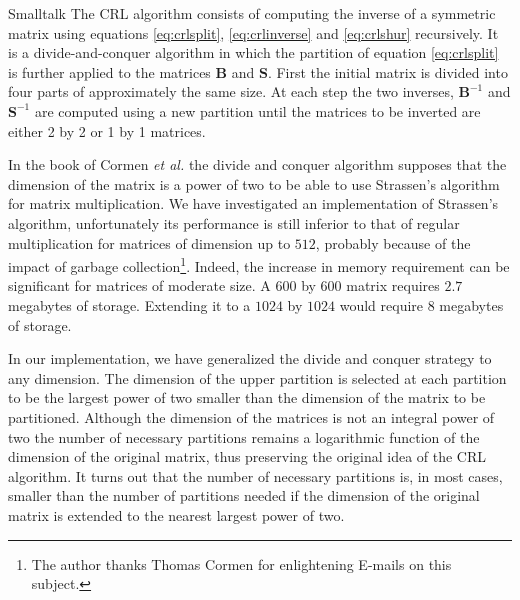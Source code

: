 \begin{displaycode}{Smalltalk}
The CRL algorithm consists of computing the inverse of a symmetric
matrix using equations \ref{eq:crlsplit}, \ref{eq:crlinverse} and
\ref{eq:crlshur} recursively. It is a divide-and-conquer algorithm
in which the partition of equation \ref{eq:crlsplit} is further
applied to the matrices $\textbf{B}$ and $\textbf{S}$. First the initial
matrix is divided into four parts of approximately the same size.
At each step the two inverses, $\textbf{B}^{-1}$ and $\textbf{S}^{-1}$
are computed using a new partition until the matrices to be
inverted are either 2 by 2 or 1 by 1 matrices.

In the book of Cormen \textit{et al.} \cite{CorLeiRiv} the divide and
conquer algorithm supposes that the dimension of the matrix is a
power of two to be able to use Strassen's algorithm for matrix
multiplication. We have investigated an implementation of
Strassen's algorithm, unfortunately its performance is still
inferior to that of regular multiplication for matrices of
dimension up to $512$, probably because of the impact of garbage
collection\footnote{The author thanks Thomas Cormen for
enlightening E-mails on this subject.}. Indeed, the increase in
memory requirement can be significant for matrices of moderate
size. A $600$ by $600$ matrix requires $2.7$ megabytes of storage.
Extending it to a $1024$ by $1024$ would require $8$ megabytes of
storage.

 In our implementation, we have
generalized the divide and conquer strategy to any dimension. The
dimension of the upper partition is selected at each partition to
be the largest power of two smaller than the dimension of the
matrix to be partitioned. Although the dimension of the matrices
is not an integral power of two the number of necessary partitions
remains a logarithmic function of the dimension of the original
matrix, thus preserving the original idea of the CRL algorithm. It
turns out that the number of necessary partitions is, in most
cases, smaller than the number of partitions needed if the
dimension of the original matrix is extended to the nearest
largest power of two.


\end{displaycode}
